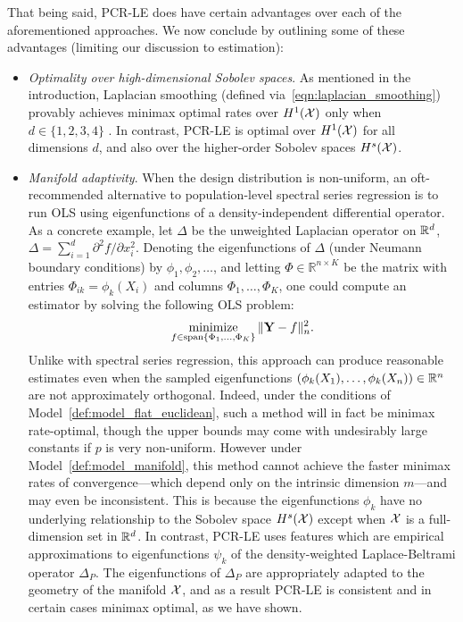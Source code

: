 That being said, PCR-LE does have certain advantages over each of the aforementioned approaches. We now conclude by outlining some of these advantages (limiting our discussion to estimation):
\begin{itemize}
	\item \emph{Optimality over high-dimensional Sobolev spaces}. As mentioned in the introduction, Laplacian smoothing (defined via~\eqref{eqn:laplacian_smoothing}) provably achieves minimax optimal rates over $H^1(\mathcal{X})$ only when $d \in \{1,2,3,4\}$ \citep{sadhanala16, green2021}. In contrast, PCR-LE is optimal over $H^1(\mathcal{X})$ for all dimensions $d$, and also over the higher-order Sobolev spaces $H^s(\mathcal{X})$. 
	\item \emph{Manifold adaptivity}. When the design distribution is non-uniform, an oft-recommended alternative to population-level spectral series regression is to run OLS using eigenfunctions of a density-independent differential operator. As a concrete example, let $\Delta$ be the unweighted Laplacian operator on $\mathbb{R}^d$, $\Delta = \sum_{i = 1}^{d} \partial^2f/\partial x_i^2$. Denoting the eigenfunctions of $\Delta$ (under Neumann boundary conditions) by $\phi_1,\phi_2,\ldots$, and letting $\Phi \in \mathbb{R}^{n \times K}$ be the matrix with entries $\Phi_{ik} = \phi_k(X_i)$ and columns $\Phi_1,\ldots,\Phi_K$,  one could compute an estimator by solving the following OLS problem:
	\begin{equation*}
	\mathop{\mathrm{minimize}}_{f \in \mathrm{span}\{\Phi_{1},\ldots,\Phi_{K}\}} \|{\bf Y} - f\|_n^2.
	\end{equation*}
	Unlike with spectral series regression, this approach can produce reasonable estimates even when the sampled eigenfunctions $(\phi_k(X_1),\ldots,\phi_k(X_n)) \in \mathbb{R}^n$ are not approximately orthogonal. Indeed, under the conditions of Model~\ref{def:model_flat_euclidean}, such a method will in fact be minimax rate-optimal, though the upper bounds may come with undesirably large constants if $p$ is very non-uniform. However under Model~\ref{def:model_manifold}, this method cannot achieve the faster minimax rates of convergence---which depend only on the intrinsic dimension $m$---and may even be inconsistent. This is because the eigenfunctions $\phi_k$ have no underlying relationship to the Sobolev space $H^s(\mathcal{X})$ except when $\mathcal{X}$ is a full-dimension set in $\mathbb{R}^d$. In contrast, PCR-LE uses features which are empirical approximations to eigenfunctions $\psi_k$ of the density-weighted Laplace-Beltrami operator $\Delta_P$. The eigenfunctions of $\Delta_P$ are appropriately adapted to the geometry of the manifold $\mathcal{X}$, and as a result PCR-LE is consistent and in certain cases minimax optimal, as we have shown. 

\end{itemize}

